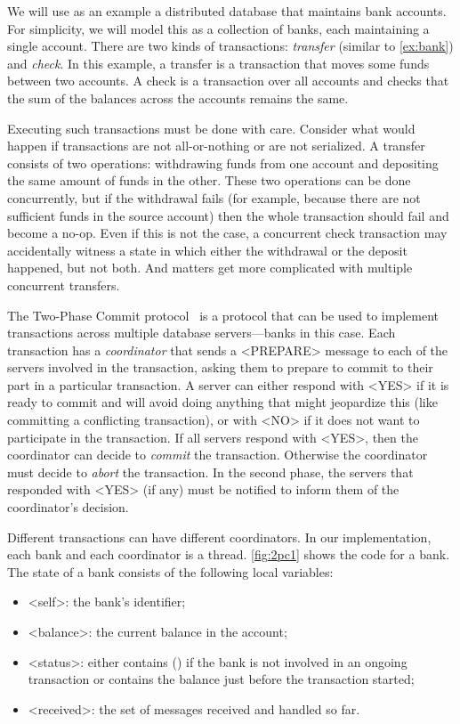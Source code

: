 \documentclass{report}
\begin{document}
We will use as an example a distributed database that maintains bank accounts.
For simplicity, we will model this as a collection of banks,
each maintaining a single account.
There are two kinds of transactions: \emph{transfer}
(similar to \autoref{ex:bank}) and \emph{check}.  In this example, a transfer
is a transaction that moves some funds between two accounts.
A check is a transaction over all accounts and checks that the sum of the
balances across the accounts remains the same.

Executing such transactions must be done with care.  Consider what
would happen if transactions are not all-or-nothing or are not
serialized.  A transfer consists of two operations: withdrawing
funds from one account and depositing the same amount of funds in
the other.  These two operations can be done concurrently, but if
the withdrawal fails (for example, because there are not sufficient
funds in the source account) then the whole transaction should fail
and become a no-op.  Even if this is not the case, a concurrent
check transaction may accidentally witness a state in which either
the withdrawal or the deposit happened, but not both.  And matters
get more complicated with multiple concurrent transfers.

The Two-Phase Commit protocol~\cite{Gray78} is a protocol that can be
used to implement transactions across multiple database servers---banks
in this case.
Each transaction has a \emph{coordinator} that sends a <{PREPARE}>
message to each of the servers involved in the transaction, asking them
to prepare to commit to their part in a particular transaction.
A server can either respond with
<{YES}> if it is ready to commit and will avoid doing anything
that might jeopardize this (like committing a conflicting transaction),
or with <{NO}> if it does not want to participate in the transaction.
If all servers respond with <{YES}>, then the coordinator can
decide to \emph{commit} the transaction.  Otherwise the coordinator
must decide to \emph{abort} the transaction.  In the second phase, the
servers that responded with <{YES}> (if any) must be notified
to inform them of the coordinator's decision.

Different transactions can have different coordinators.  In our
implementation, each bank and each coordinator is a thread.
\autoref{fig:2pc1} shows the code for a bank.
The state of a bank consists of the following local variables:
\begin{itemize}
\item <{self}>: the bank's identifier;
\item <{balance}>: the current balance in the account;
\item <{status}>: either contains () if the bank is not involved in an
ongoing transaction or contains the balance
just before the transaction started;
\item <{received}>: the set of messages received and handled so far.
\end{itemize}
\end{document}

